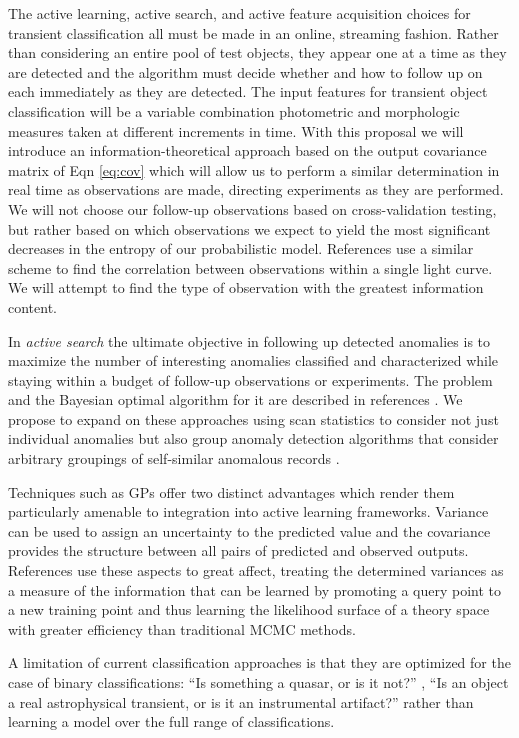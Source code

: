 \documentclass[prd,nofootbib,floatfix,11pt,tightenlines,nofootinbib]{revtex4}
\begin{document}
The active learning, active search, and active feature
acquisition choices for transient classification
all must be made in an online, streaming fashion.  
Rather than
considering an entire pool of test objects, they appear one at a time as
they are detected and the algorithm must decide whether and how to follow
up on each immediately as they are detected. 
The input features for transient object classification will be 
a variable combination photometric
and morphologic measures taken at different increments in time. With
this proposal we will  introduce an information-theoretical approach 
based on the output covariance matrix of Eqn \ref{eq:cov} which will allow
us to perform a similar determination in real time as observations are made,
directing experiments as they are performed.
We will not choose our follow-up observations based on cross-validation testing,
but rather based on which observations we expect to yield the most significant
decreases in the entropy of our probabilistic model.
References \cite{huijse2011,huijse2012} use a similar scheme to find the correlation
between observations within a single light curve.  We will attempt to find
the type of observation with the greatest information content. 

In {\it active search} the ultimate objective in following up detected
anomalies is to maximize the number of interesting anomalies
classified and characterized while staying within a budget of
follow-up observations or experiments. The problem and the Bayesian
optimal algorithm for it are described in references
\cite{Garnett11,Garnett12}. We propose to expand on these approaches using scan
statistics to consider not just individual anomalies but also group
anomaly detection algorithms that consider arbitrary groupings of
self-similar anomalous records \cite{Neill05}.


Techniques such as GPs offer
two distinct advantages which render them particularly amenable to
integration into active learning frameworks.  Variance can be used
to assign an uncertainty to the predicted value and the covariance
provides the structure between all pairs of predicted and observed
outputs.  References \cite{daniel2012,bryan} use these
aspects to great affect, treating the determined variances as a
measure of the information that can be learned by promoting a query
point to a new training point and thus learning the likelihood surface
of a theory space with greater efficiency than traditional MCMC
methods.


A limitation of current classification approaches is that they are 
optimized for the case of binary classifications: ``Is something a 
quasar, or is it not?''  \cite{kim2011,pichara2012}, ``Is an 
object a real astrophysical transient, or is it an instrumental 
artifact?''  \cite{brink2012} rather than learning a model over the 
full range of classifications. 
\end{document}

